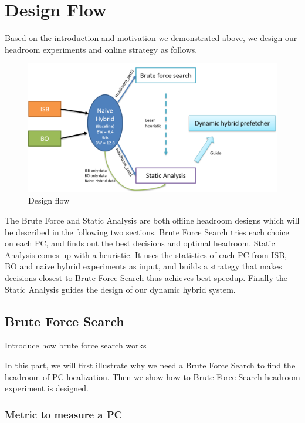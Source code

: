 \section{Design Flow}
\label{sec:designflow}

Based on the introduction and motivation we demonstrated above, we design our headroom experiments and online strategy as follows. 


\begin{figure}[ht!]
	\centering
	\includegraphics[width=1.0\textwidth]{images/design_flow.png}
	\caption{Design flow}
	\label{fig:design_flow}
\end{figure}

The Brute Force and Static Analysis are both offline headroom designs which will be described in the following two sections. Brute Force Search tries each choice on each PC, and finds out the best decisions and optimal headroom. Static Analysis comes up with a heuristic. It uses the statistics of each PC from ISB, BO and naive hybrid experiments as input, and builds a strategy that makes decisions closest to Brute Force Search thus achieves best speedup. Finally the Static Analysis guides the design of our dynamic hybrid system.


  \subsection{Brute Force Search}
  \label{sec:bruteforcesearch}
  
  Introduce how brute force search works \par
  In this part, we will first illustrate why we need a Brute Force Search to find the headroom of PC localization. Then we show how to Brute Force Search headroom experiment is designed. \par
  
  \subsubsection{Metric to measure a PC}
  \label{sec:metricPC}
  
